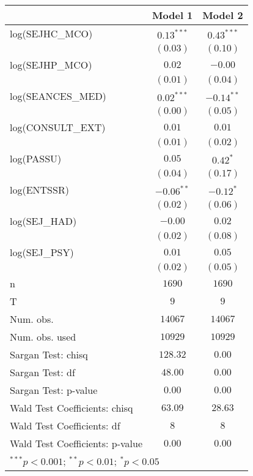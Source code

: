 
\begin{tabular}{l c c}
\hline
 & Model 1 & Model 2 \\
\hline
log(SEJHC\_MCO)                 & $0.13^{***}$ & $0.43^{***}$ \\
                                & $(0.03)$     & $(0.10)$     \\
log(SEJHP\_MCO)                 & $0.02$       & $-0.00$      \\
                                & $(0.01)$     & $(0.04)$     \\
log(SEANCES\_MED)               & $0.02^{***}$ & $-0.14^{**}$ \\
                                & $(0.00)$     & $(0.05)$     \\
log(CONSULT\_EXT)               & $0.01$       & $0.01$       \\
                                & $(0.01)$     & $(0.02)$     \\
log(PASSU)                      & $0.05$       & $0.42^{*}$   \\
                                & $(0.04)$     & $(0.17)$     \\
log(ENTSSR)                     & $-0.06^{**}$ & $-0.12^{*}$  \\
                                & $(0.02)$     & $(0.06)$     \\
log(SEJ\_HAD)                   & $-0.00$      & $0.02$       \\
                                & $(0.02)$     & $(0.08)$     \\
log(SEJ\_PSY)                   & $0.01$       & $0.05$       \\
                                & $(0.02)$     & $(0.05)$     \\
\hline
n                               & $1690$       & $1690$       \\
T                               & $9$          & $9$          \\
Num. obs.                       & $14067$      & $14067$      \\
Num. obs. used                  & $10929$      & $10929$      \\
Sargan Test: chisq              & $128.32$     & $0.00$       \\
Sargan Test: df                 & $48.00$      & $0.00$       \\
Sargan Test: p-value            & $0.00$       & $0.00$       \\
Wald Test Coefficients: chisq   & $63.09$      & $28.63$      \\
Wald Test Coefficients: df      & $8$          & $8$          \\
Wald Test Coefficients: p-value & $0.00$       & $0.00$       \\
\hline
\multicolumn{3}{l}{\scriptsize{$^{***}p<0.001$; $^{**}p<0.01$; $^{*}p<0.05$}}
\end{tabular}
